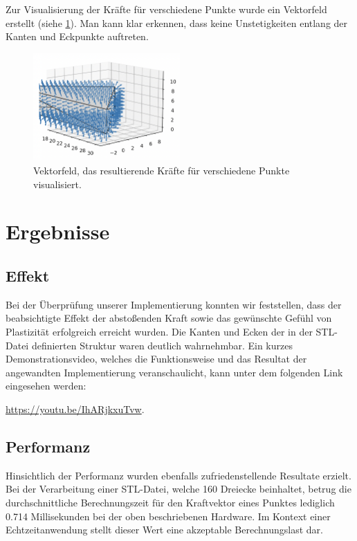 \documentclass[conference]{IEEEtran}
\begin{document}
Zur Visualisierung der Kräfte für verschiedene Punkte wurde ein Vektorfeld erstellt (siehe \ref{fig:vectorfield}). Man kann klar erkennen, dass keine Unstetigkeiten entlang der Kanten und Eckpunkte auftreten.

\begin{figure}[h]
    \centering
    \includegraphics[width=0.5\textwidth]{pics/vectorfield.png}
    \caption{Vektorfeld, das resultierende Kräfte für verschiedene Punkte visualisiert.}
    \label{fig:vectorfield}
\end{figure}


\section{Ergebnisse}

\subsection{Effekt}
Bei der Überprüfung unserer Implementierung konnten wir feststellen, dass der beabsichtigte Effekt der abstoßenden Kraft sowie das gewünschte Gefühl von Plastizität erfolgreich erreicht wurden. Die Kanten und Ecken der in der STL-Datei definierten Struktur waren deutlich wahrnehmbar. Ein kurzes Demonstrationsvideo, welches die Funktionsweise und das Resultat der angewandten Implementierung veranschaulicht, kann unter dem folgenden Link eingesehen werden:
\begin{minipage}{\textwidth}
    \nobreak\url{https://youtu.be/IhARjkxuTvw}.
\end{minipage}

\subsection{Performanz}
Hinsichtlich der Performanz wurden ebenfalls zufriedenstellende Resultate erzielt. Bei der Verarbeitung einer STL-Datei, welche 160 Dreiecke beinhaltet, betrug die durchschnittliche Berechnungszeit für den Kraftvektor eines Punktes lediglich 0.714 Millisekunden bei der oben beschriebenen Hardware. Im Kontext einer Echtzeitanwendung stellt dieser Wert eine akzeptable Berechnungslast dar. 
\end{document}
